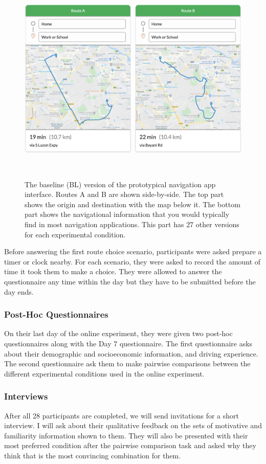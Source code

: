 \begin{figure}[h]
\centering
  \includegraphics[scale=0.4]{figures/s3-daily-proto.png}
  \caption{The baseline (BL) version of the prototypical navigation app interface. Routes A and B are shown side-by-side. The top part shows the origin and destination with the map below it. The bottom part shows the navigational information that you would typically find in most navigation applications. This part has 27 other versions for each experimental condition.}~\label{fig:s3-daily-proto}
\end{figure}

Before answering the first route choice scenario, participants were asked prepare a timer or clock nearby. For each scenario, they were asked to record the amount of time it took them to make a choice. They were allowed to answer the questionnaire any time within the day but they have to be submitted before the day ends.

\subsubsection{Post-Hoc Questionnaires}
On their last day of the online experiment, they were given two post-hoc questionnaires along with the Day 7 questionnaire. The first questionnaire asks about their demographic and socioeconomic information, and driving experience. The second questionnaire ask them to make pairwise comparisons between the different experimental conditions used in the online experiment.  

\subsubsection{Interviews}
After all 28 participants are completed, we will send invitations for a short interview. I will ask about their qualitative feedback on the sets of motivative and familiarity information shown to them. They will also be presented with their most preferred condition after the pairwise comparison task and asked why they think that is the most convincing combination for them.

